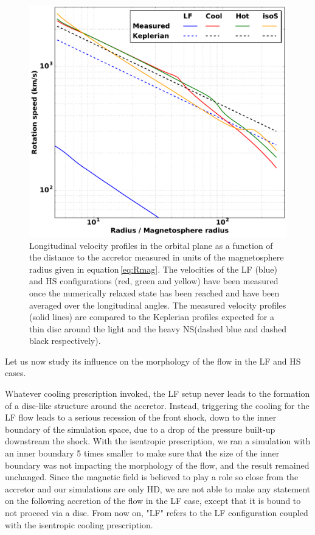 \documentclass{aa}
\makeatletter
\newcommand*{\ns}{NS\@\xspace}
\makeatother
\begin{document}
\begin{figure}
\centering
\includegraphics[width=0.95\columnwidth]{Pictures/v_phi_Kep.pdf}
\caption{Longitudinal velocity profiles in the orbital plane as a function of the distance to the accretor measured in units of the magnetosphere radius given in equation\,\eqref{eq:Rmag}. The velocities of the LF (blue) and HS configurations (red, green and yellow) have been measured once the numerically relaxed state has been reached and have been averaged over the longitudinal angles. The measured velocity profiles (solid lines) are compared to the Keplerian profiles expected for a thin disc around the light and the heavy \ns (dashed blue and dashed black respectively).}
\label{fig:vphi}
\end{figure} 

Let us now study its influence on the morphology of the flow in the LF and HS cases.

Whatever cooling prescription invoked, the LF setup never leads to the formation of a disc-like structure around the accretor. Instead, triggering the cooling for the LF flow leads to a serious recession of the front shock, down to the inner boundary of the simulation space, due to a drop of the pressure built-up downstream the shock. With the isentropic prescription, we ran a simulation with an inner boundary 5 times smaller to make sure that the size of the inner boundary was not impacting the morphology of the flow, and the result remained unchanged. Since the magnetic field is believed to play a role so close from the accretor and our simulations are only HD, we are not able to make any statement on the following accretion of the flow in the LF case, except that it is bound to not proceed via a disc. From now on, "LF" refers to the LF configuration coupled with the isentropic cooling prescription.
\end{document}

